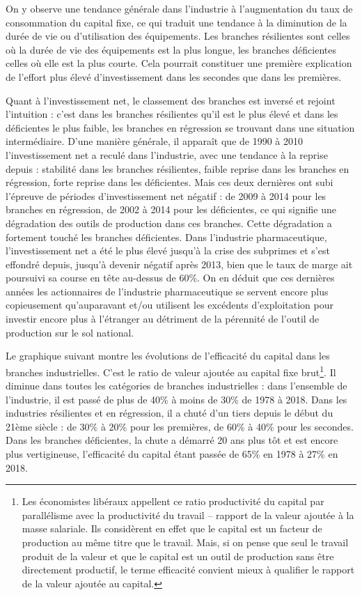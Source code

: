 \documentclass[a4paper]{article}
\begin{document}
On y observe une tendance générale dans l’industrie à l’augmentation du taux de consommation du capital fixe, ce qui traduit une tendance à la diminution de la durée de vie ou d’utilisation des équipements.   Les branches résilientes sont celles où la durée de vie des équipements est la plus longue, les branches déficientes celles où elle est la plus courte. Cela pourrait constituer une première explication de l’effort plus élevé d’investissement dans les secondes que dans les premières.

Quant à l’investissement net, le classement des branches est inversé et rejoint l’intuition : c’est dans les branches résilientes qu’il est le plus élevé et dans les déficientes le plus faible, les branches en régression se trouvant dans une situation intermédiaire. D’une manière générale, il apparaît que de 1990 à 2010 l’investissement net a reculé dans l’industrie, avec une tendance à la reprise depuis : stabilité dans les branches résilientes, faible reprise dans les branches en régression, forte reprise dans les déficientes. Mais ces deux dernières ont subi l’épreuve de périodes d’investissement net négatif : de 2009 à 2014 pour les branches en régression, de 2002 à 2014 pour les déficientes, ce qui signifie une dégradation des outils de production dans ces branches. Cette dégradation a fortement touché les branches déficientes. Dans l’industrie pharmaceutique, l’investissement net a été le plus élevé  jusqu’à la crise des subprimes et s’est effondré depuis, jusqu’à devenir négatif après 2013, bien que le taux de marge ait poursuivi sa course en tête au-dessus de 60\%. On en déduit que ces dernières années les actionnaires de l’industrie pharmaceutique se servent encore plus copieusement qu’auparavant et/ou utilisent les excédents d’exploitation pour investir encore plus à l’étranger au détriment de la pérennité de l’outil de production sur le sol national.

Le graphique suivant montre les évolutions de l’efficacité du capital dans les branches industrielles. C’est le ratio de valeur ajoutée au capital fixe brut\footnote{Les économistes libéraux appellent ce ratio productivité du capital par parallélisme avec la productivité du travail – rapport de la valeur ajoutée à la masse salariale. Ils considèrent en effet que le capital est un facteur de production au même titre que le travail. Mais, si on pense que seul le travail produit de la valeur et que le capital est un outil de production sans être directement productif, le terme efficacité convient mieux à qualifier le rapport de la valeur ajoutée au capital.}. Il diminue dans toutes les catégories de branches industrielles : dans l’ensemble de l’industrie, il est passé de plus de 40\% à moins de 30\% de 1978 à 2018. Dans les industries résilientes et en régression,  il a chuté d’un tiers depuis le début du 21ème siècle : de 30\% à 20\% pour les premières, de 60\% à 40\% pour les secondes. Dans les branches déficientes, la chute a démarré 20 ans plus tôt et est encore plus vertigineuse, l’efficacité du capital étant passée de 65\% en 1978 à 27\% en 2018.
\end{document}
